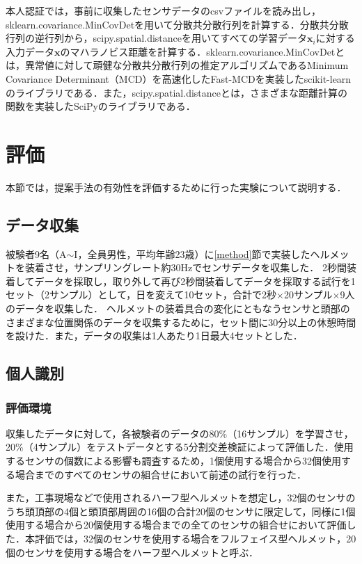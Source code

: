 \documentclass[Japanese,noauthor]{dicomopapers}
\begin{document}
本人認証では，事前に収集したセンサデータのcsvファイルを読み出し，sklearn.covariance.MinCovDetを用いて分散共分散行列を計算する．分散共分散行列の逆行列から，scipy.spatial.distanceを用いてすべての学習データ$\bm{x}_i$に対する入力データ$\bm{x}$のマハラノビス距離を計算する．sklearn.covariance.MinCovDetとは，異常値に対して頑健な分散共分散行列の推定アルゴリズムであるMinimum Covariance Determinant（MCD）を高速化したFast-MCD\cite{fast_mcd}を実装したscikit-learnのライブラリである．また，scipy.spatial.distanceとは，さまざまな距離計算の関数を実装したSciPy\cite{scipy}のライブラリである．

\section{評価}
\label{evaluation}
本節では，提案手法の有効性を評価するために行った実験について説明する．

\subsection{データ収集}
被験者9名（A$\sim$I，全員男性，平均年齢23歳）に\ref{method}節で実装したヘルメットを装着させ，サンプリングレート約30Hzでセンサデータを収集した．
2秒間装着してデータを採取し，取り外して再び2秒間装着してデータを採取する試行を1セット（2サンプル）として，日を変えて10セット，合計で2秒$\times$20サンプル$\times$9人のデータを収集した．
ヘルメットの装着具合の変化にともなうセンサと頭部のさまざまな位置関係のデータを収集するために，セット間に30分以上の休憩時間を設けた．また，データの収集は1人あたり1日最大4セットとした．

\subsection{個人識別}
\subsubsection{評価環境}
収集したデータに対して，各被験者のデータの80\%（16サンプル）を学習させ，20\%（4サンプル）をテストデータとする5分割交差検証によって評価した．使用するセンサの個数による影響も調査するため，1個使用する場合から32個使用する場合までのすべてのセンサの組合せにおいて前述の試行を行った．

また，工事現場などで使用されるハーフ型ヘルメットを想定し，32個のセンサのうち頭頂部の4個と頭頂部周囲の16個の合計20個のセンサに限定して，同様に1個使用する場合から20個使用する場合までの全てのセンサの組合せにおいて評価した．本評価では，32個のセンサを使用する場合をフルフェイス型ヘルメット，20個のセンサを使用する場合をハーフ型ヘルメットと呼ぶ．
\end{document}
